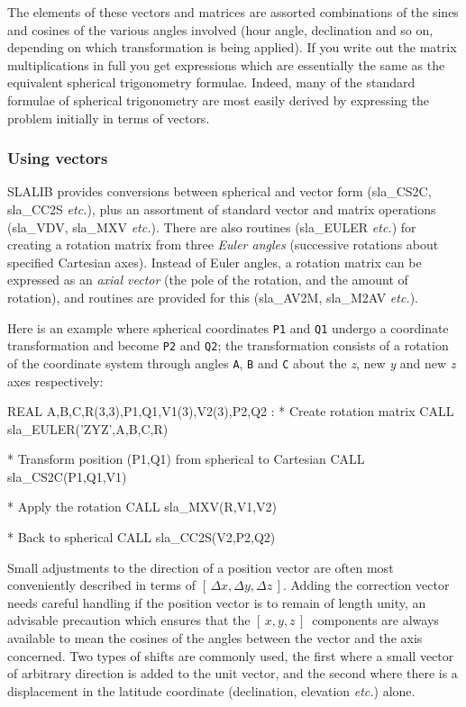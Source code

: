 \documentclass[11pt,twoside,nolof]{starlink}
\providecommand{\xyz}       {$[\,x,y,z\,]$}
\begin{document}
The elements of these vectors and matrices are assorted combinations of
the sines and cosines of the various angles involved (hour angle,
declination and so on, depending on which transformation is
being applied).  If you write out the matrix multiplications
in full you get expressions which are essentially the same as the
equivalent spherical trigonometry formulae.  Indeed, many of the
standard formulae of spherical trigonometry are most easily
derived by expressing the problem initially in
terms of vectors.

\subsubsection{Using vectors}
SLALIB provides conversions between spherical and vector
form
(sla\_CS2C,
sla\_CC2S
\textit{etc.}), plus an assortment
of standard vector and matrix operations
(sla\_VDV,
sla\_MXV
\textit{etc.}).
There are also routines
(sla\_EULER
\textit{etc.}) for creating a rotation matrix
from three \textit{Euler angles}\/ (successive rotations about
specified Cartesian axes).  Instead of Euler angles, a rotation
matrix can be expressed as an \textit{axial vector}\/ (the pole of the rotation,
and the amount of rotation), and routines are provided for this
(sla\_AV2M,
sla\_M2AV
\textit{etc.}).

Here is an example where spherical coordinates \texttt{P1} and \texttt{Q1}
undergo a coordinate transformation and become \texttt{P2} and \texttt{Q2};
the transformation consists of a rotation of the coordinate system
through angles \texttt{A}, \texttt{B} and \texttt{C} about the
\textit{z}, new \textit{y}\/ and new \textit{z}\/ axes respectively:
\goodbreak
\begin{terminalv}
            REAL A,B,C,R(3,3),P1,Q1,V1(3),V2(3),P2,Q2
             :
      *  Create rotation matrix
            CALL sla_EULER('ZYZ',A,B,C,R)

      *  Transform position (P1,Q1) from spherical to Cartesian
            CALL sla_CS2C(P1,Q1,V1)

      *  Apply the rotation
            CALL sla_MXV(R,V1,V2)

      *  Back to spherical
            CALL sla_CC2S(V2,P2,Q2)
\end{terminalv}
\goodbreak
Small adjustments to the direction of a position
vector are often most conveniently described in terms of
$[\,\Delta x,\Delta y, \Delta z\,]$.  Adding the correction
vector needs careful handling if the position
vector is to remain of length unity, an advisable precaution which
ensures that
the \xyz\ components are always available to mean the cosines of
the angles between the vector and the axis concerned.  Two types
of shifts are commonly used,
the first where a small vector of arbitrary direction is
added to the unit vector, and the second where there is a displacement
in the latitude coordinate (declination, elevation \textit{etc.}) alone.
\end{document}
